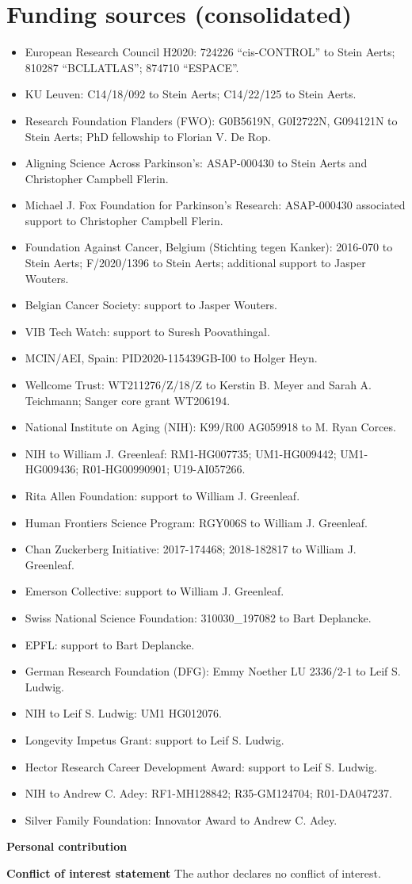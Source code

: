 \section*{Funding sources (consolidated)}
\begin{itemize}
	\item European Research Council H2020: 724226 ``cis-CONTROL'' to Stein Aerts; 810287 ``BCLLATLAS''; 874710 ``ESPACE''.
	\item KU Leuven: C14/18/092 to Stein Aerts; C14/22/125 to Stein Aerts.
	\item Research Foundation Flanders (FWO): G0B5619N, G0I2722N, G094121N to Stein Aerts; PhD fellowship to Florian V. De Rop.
	\item Aligning Science Across Parkinson's: ASAP-000430 to Stein Aerts and Christopher Campbell Flerin.
	\item Michael J. Fox Foundation for Parkinson's Research: ASAP-000430 associated support to Christopher Campbell Flerin.
	\item Foundation Against Cancer, Belgium (Stichting tegen Kanker): 2016-070 to Stein Aerts; F/2020/1396 to Stein Aerts; additional support to Jasper Wouters.
	\item Belgian Cancer Society: support to Jasper Wouters.
	\item VIB Tech Watch: support to Suresh Poovathingal.
	\item MCIN/AEI, Spain: PID2020-115439GB-I00 to Holger Heyn.
	\item Wellcome Trust: WT211276/Z/18/Z to Kerstin B. Meyer and Sarah A. Teichmann; Sanger core grant WT206194.
	\item National Institute on Aging (NIH): K99/R00 AG059918 to M. Ryan Corces.
	\item NIH to William J. Greenleaf: RM1-HG007735; UM1-HG009442; UM1-HG009436; R01-HG00990901; U19-AI057266.
	\item Rita Allen Foundation: support to William J. Greenleaf.
	\item Human Frontiers Science Program: RGY006S to William J. Greenleaf.
	\item Chan Zuckerberg Initiative: 2017-174468; 2018-182817 to William J. Greenleaf.
	\item Emerson Collective: support to William J. Greenleaf.
	\item Swiss National Science Foundation: 310030\_197082 to Bart Deplancke.
	\item EPFL: support to Bart Deplancke.
	\item German Research Foundation (DFG): Emmy Noether LU 2336/2-1 to Leif S. Ludwig.
	\item NIH to Leif S. Ludwig: UM1 HG012076.
	\item Longevity Impetus Grant: support to Leif S. Ludwig.
	\item Hector Research Career Development Award: support to Leif S. Ludwig.
	\item NIH to Andrew C. Adey: RF1-MH128842; R35-GM124704; R01-DA047237.
	\item Silver Family Foundation: Innovator Award to Andrew C. Adey.
\end{itemize}

\textbf{Personal contribution}

\textbf{Conflict of interest statement}
The author declares no conflict of interest.